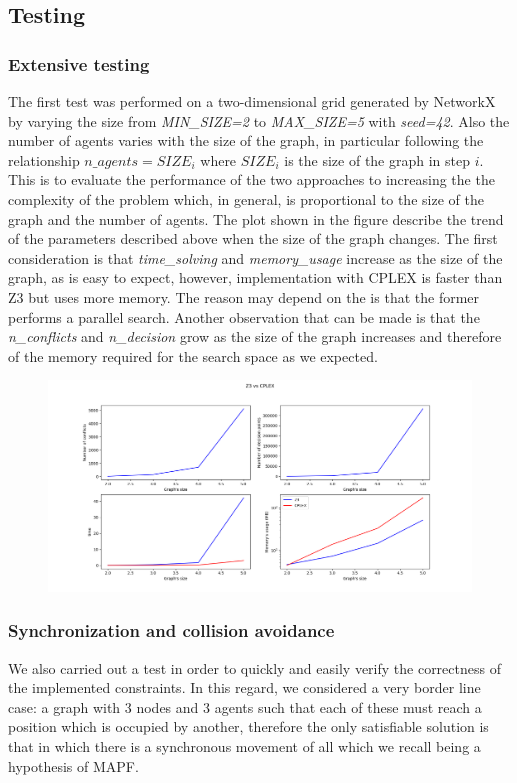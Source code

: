 \documentclass[12pt, a4paper, hidelinks]{article}
\numberwithin{equation}{section}
\begin{document}
\subsection{Testing}\label{subsec:testing}
\subsubsection{Extensive testing}
The first test was performed on a two-dimensional grid generated by NetworkX by varying the size from \textit{MIN\_SIZE=2} to \textit{MAX\_SIZE=5} with \textit{seed=42}.
Also the number of agents varies with the size of the graph, in particular following the relationship $n\_agents = SIZE_i$ where $SIZE_i$ is the size of the graph in step $i$.
This is to evaluate the performance of the two approaches to increasing the the complexity of the problem which, in general, is proportional to the size of the graph and the number of agents.
The plot shown in the figure describe the trend of the parameters described above when the size of the graph changes.
The first consideration is that \textit{time\_solving} and \textit{memory\_usage} increase as the size of the graph, as is easy to expect, however, implementation with CPLEX is faster than Z3 but uses more memory.
The reason may depend on the is that the former performs a parallel search.
Another observation that can be made is that the \textit{n\_conflicts} and \textit{n\_decision} grow as the size of the graph increases and therefore of the memory required for the search space as we expected.
\begin{figure}[h!]
\begin{center}
  \includegraphics[width=16cm]{plot_test.png}\\
\end{center}
\end{figure}
\subsubsection{Synchronization and collision avoidance}
We also carried out a test in order to quickly and easily verify the correctness of the implemented constraints.
In this regard, we considered a very border line case: a graph with 3 nodes and 3 agents such that each of these must reach a position which is occupied by another, therefore the only satisfiable solution is that in which there is a synchronous movement of all which we recall being a hypothesis of MAPF\@.
\end{document}
